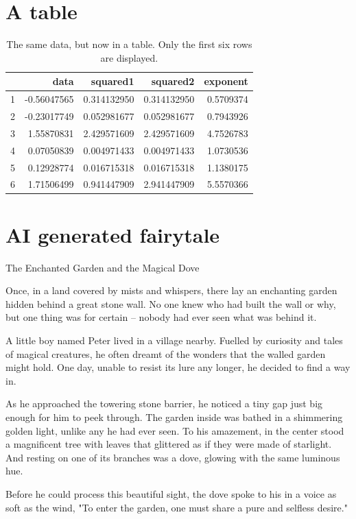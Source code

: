 \documentclass[10pt, fullpage, a4paper, titlepage]{article}
\begin{document}
\section{A table}
\begin{table}[h!]
	\centering
	\caption{The same data, but now in a table. Only the first six rows are displayed.}
	\begin{tabular}{rrrrr}
  		\hline
		 & data & squared1 & squared2 & exponent \\ 
		\hline
		1 & -0.56047565 & 0.314132950 & 0.314132950 & 0.5709374 \\ 
  		2 & -0.23017749 & 0.052981677 & 0.052981677 & 0.7943926 \\
		3 & 1.55870831  & 2.429571609 & 2.429571609 & 4.7526783 \\
  		4 & 0.07050839  & 0.004971433 & 0.004971433 & 1.0730536 \\
  		5 & 0.12928774  & 0.016715318 & 0.016715318 & 1.1380175 \\
  		6 & 1.71506499  & 0.941447909 & 2.941447909 & 5.5570366 \\
		\hline
	\end{tabular}
\end{table}

\newpage
\section{AI generated fairytale}
The Enchanted Garden and the Magical Dove

Once, in a land covered by mists and whispers, there lay an enchanting garden hidden behind a great stone wall. No one knew who had built the wall or why, but one thing was for certain – nobody had ever seen what was behind it.

A little boy named Peter lived in a village nearby. Fuelled by curiosity and tales of magical creatures, he often dreamt of the wonders that the walled garden might hold. One day, unable to resist its lure any longer, he decided to find a way in.

As he approached the towering stone barrier, he noticed a tiny gap just big enough for him to peek through. The garden inside was bathed in a shimmering golden light, unlike any he had ever seen. To his amazement, in the center stood a magnificent tree with leaves that glittered as if they were made of starlight. And resting on one of its branches was a dove, glowing with the same luminous hue.

Before he could process this beautiful sight, the dove spoke to his in a voice as soft as the wind, "To enter the garden, one must share a pure and selfless desire."
\end{document}
